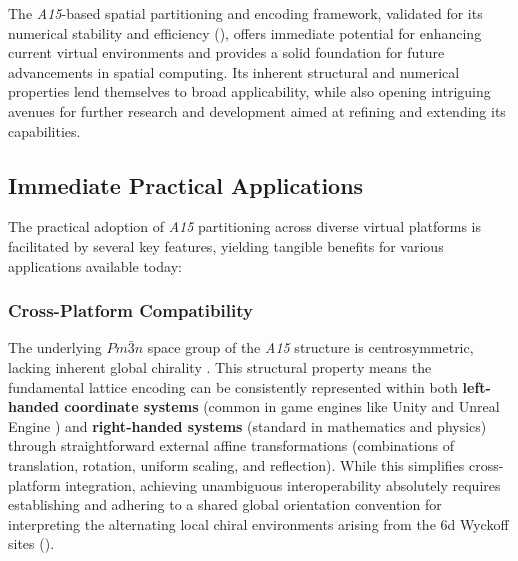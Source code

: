 \documentclass[10pt]{article}
\def\AAAB{\textit{A15}}
\begin{document}
The \AAAB{}-based spatial partitioning and encoding framework, validated for its numerical stability and efficiency (), offers immediate potential for enhancing current virtual environments and provides a solid foundation for future advancements in spatial computing. Its inherent structural and numerical properties lend themselves to broad applicability, while also opening intriguing avenues for further research and development aimed at refining and extending its capabilities.

\subsection{Immediate Practical Applications}\label{subsec-applications}

The practical adoption of \AAAB{} partitioning across diverse virtual platforms is facilitated by several key features, yielding tangible benefits for various applications available today:

\subsubsection{Cross-Platform Compatibility}\label{subsubsec-apps-coordsys}
The underlying $Pm\bar{3}n$ space group of the \AAAB{} structure is centrosymmetric, lacking inherent global chirality \cite{ITCVolumeA2016}. This structural property means the fundamental lattice encoding can be consistently represented within both \textbf{left-handed coordinate systems} (common in game engines like Unity \cite{UnityCoords} and Unreal Engine \cite{UnrealCoords}) and \textbf{right-handed systems} (standard in mathematics and physics) through straightforward external affine transformations (combinations of translation, rotation, uniform scaling, and reflection). While this simplifies cross-platform integration, achieving unambiguous interoperability absolutely requires establishing and adhering to a shared global orientation convention for interpreting the alternating local chiral environments arising from the 6d Wyckoff sites ().
\end{document}
